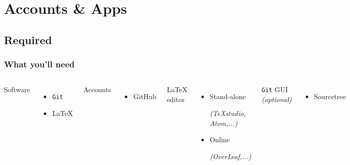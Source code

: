\documentclass{beamer}
\begin{document}

\section{Accounts \& Apps}

\subsection{Required}

\begin{frame}
    \frametitle{What you'll need}

\begin{columns}


Software
    \begin{itemize}
        \item \texttt{Git}
        \item \LaTeX
    \end{itemize}
Accounts
    \begin{itemize}
        \item GitHub\footnotemark
    \end{itemize}

\LaTeX{} editor
    \begin{itemize}
        \item Stand-alone {\tiny \emph{(TeXstudio, Atom,...)} \par}
        \item Online {\tiny \emph{(OverLeaf,...)} \par}
    \end{itemize}
\texttt{Git} GUI \emph{(optional)}
    \begin{itemize}
        \item Sourcetree
    \end{itemize}


\end{columns}
\end{frame}
\end{document}
